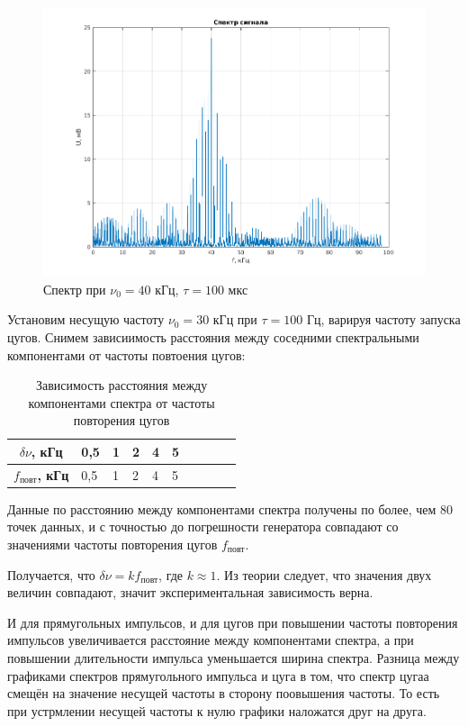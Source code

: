 \begin{figure}[h!]
    \centering
    \includegraphics[width = 14 cm]{images/2_40k.png}
    \caption{Спектр при $\nu_0 = 40$ кГц, $\tau = 100$ мкс}
\end{figure}

Установим несущую частоту $\nu_0 = 30$ кГц при $\tau = 100$ Гц, варируя частоту запуска цугов. Снимем зависиимость расстояния между соседними спектральными компонентами от частоты повтоения цугов:

\begin{table}[]
    \centering
    \begin{tabular}{|c|l|l|l|l|l|l|l|l|l|}
        \hline
        \textbf{$\delta \nu$, кГц}      & 0,5 & 1  & 2 & 4  & 5  \\ \hline
        \textbf{$f_{\text{повт}}$, кГц} & 0,5 & 1  & 2 & 4  & 5  \\ \hline
    \end{tabular}
    \caption{Зависимость расстояния между компонентами спектра от частоты повторения цугов}
\end{table}

Данные по расстоянию между компонентами спектра получены по более, чем 80 точек данных, и с точностью до погрешности генератора совпадают со значениями частоты повторения цугов $f_{\text{повт}}$.

Получается, что $\delta \nu = k f_{\text{повт}}$, где $k \approx 1$. Из теории следует, что значения двух величин совпадают, значит экспериментальная зависимость верна.

И для прямугольных импульсов, и для цугов при повышении частоты повторения импульсов увеличивается расстояние между компонентами спектра, а при повышении длительности импульса уменьшается ширина спектра. Разница между графиками спектров прямугольного импульса и цуга в том, что спектр цугаа смещён на значение несущей частоты в сторону поовышения частоты. То есть при устрмлении несущей частоты к нулю графики наложатся друг на друга.

